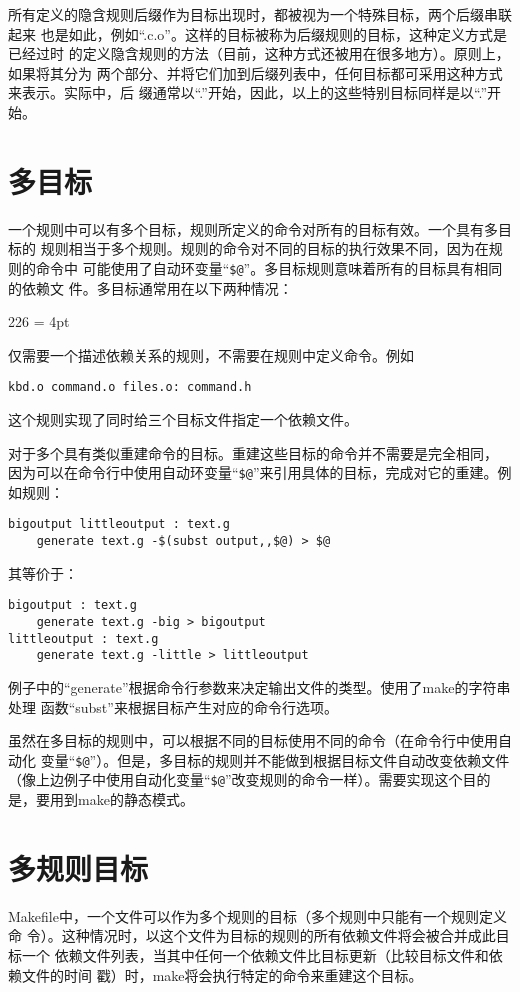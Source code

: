 所有定义的隐含规则后缀作为目标出现时，都被视为一个特殊目标，两个后缀串联起来
也是如此，例如“.c.o”。这样的目标被称为后缀规则的目标，这种定义方式是已经过时
的定义隐含规则的方法（目前，这种方式还被用在很多地方）。原则上，如果将其分为
两个部分、并将它们加到后缀列表中，任何目标都可采用这种方式来表示。实际中，后
缀通常以“.”开始，因此，以上的这些特别目标同样是以“.”开始。

\section{多目标}
一个规则中可以有多个目标，规则所定义的命令对所有的目标有效。一个具有多目标的
规则相当于多个规则。规则的命令对不同的目标的执行效果不同，因为在规则的命令中
可能使用了自动环变量“\verb"$@"”。多目标规则意味着所有的目标具有相同的依赖文
件。多目标通常用在以下两种情况：

\begin{dinglist}{226}
\itemsep = 4pt \parskip=0pt

\item 仅需要一个描述依赖关系的规则，不需要在规则中定义命令。例如
\begin{Verbatim}[]
kbd.o command.o files.o: command.h
\end{Verbatim}
这个规则实现了同时给三个目标文件指定一个依赖文件。

\item 对于多个具有类似重建命令的目标。重建这些目标的命令并不需要是完全相同，
    因为可以在命令行中使用自动环变量“\verb"$@"”来引用具体的目标，完成对它的重建。例
    如规则：
\begin{Verbatim}[]
bigoutput littleoutput : text.g
    generate text.g -$(subst output,,$@) > $@
\end{Verbatim}
其等价于：
\begin{Verbatim}[]
bigoutput : text.g
    generate text.g -big > bigoutput
littleoutput : text.g
    generate text.g -little > littleoutput
\end{Verbatim}
例子中的“generate”根据命令行参数来决定输出文件的类型。使用了make的字符串处理
函数“subst”来根据目标产生对应的命令行选项。

\end{dinglist}

虽然在多目标的规则中，可以根据不同的目标使用不同的命令（在命令行中使用自动化
变量“\verb"$@"”）。但是，多目标的规则并不能做到根据目标文件自动改变依赖文件
（像上边例子中使用自动化变量“\verb"$@"”改变规则的命令一样）。需要实现这个目的
是，要用到make的静态模式。

\section{多规则目标}
Makefile中，一个文件可以作为多个规则的目标（多个规则中只能有一个规则定义命
令）。这种情况时，以这个文件为目标的规则的所有依赖文件将会被合并成此目标一个
依赖文件列表，当其中任何一个依赖文件比目标更新（比较目标文件和依赖文件的时间
戳）时，make将会执行特定的命令来重建这个目标。

